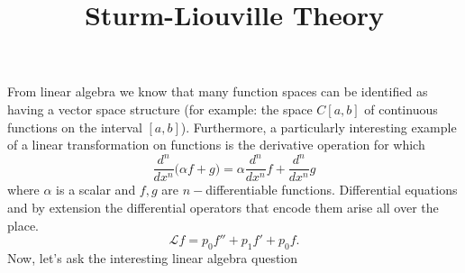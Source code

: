 \documentclass{article}
\title{Sturm-Liouville Theory}
\begin{document}
From linear algebra we know that many function spaces can be identified as
having a vector space structure (for example: the space $C[a,b]$ of continuous
functions on the interval $[a,b]$). Furthermore, a particularly interesting
example of a linear transformation on functions is the derivative operation for which
\begin{equation}
  \frac{d^n}{dx^n}\Big(\alpha f + g\Big) = \alpha\frac{d^n}{dx^n}f + \frac{d^n}{dx^n}g
\end{equation}
where $\alpha$ is a scalar and $f,g$ are $n-$differentiable functions.
Differential equations and by extension the differential operators that encode
them arise all over the place. 
\begin{equation}
  \mathcal{L}f = p_0f'' + p_1f' + p_0f. 
\end{equation}
Now, let's ask the interesting linear algebra question 
\end{document}
